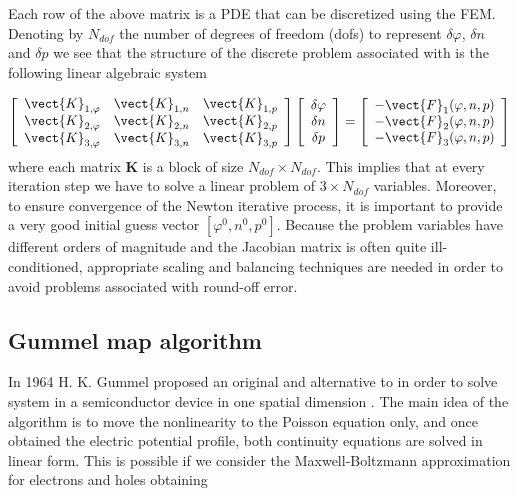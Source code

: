  Each row of the above matrix is a PDE that can be discretized using the FEM. Denoting by $N_{dof}$ the number of degrees of freedom (dofs) to represent $\delta \varphi$, $\delta n$ and $\delta p$ we see that the structure of the discrete problem associated with  is the following linear algebraic system

\begin{equation}
\left[
\begin{array}{ccc}
\vect{K}_{1,\varphi} & \vect{K}_{1,n} & \vect{K}_{1,p} \\
\vect{K}_{2,\varphi} & \vect{K}_{2,n} & \vect{K}_{2,p} \\
\vect{K}_{3,\varphi} & \vect{K}_{3,n} & \vect{K}_{3,p} \\
\end{array}
\right]
\left[
\begin{array}{c}
\delta \varphi  \\
\delta n  \\
\delta p 
\end{array}
\right]
=
\left[
\begin{array}{c}
-\vect{F}_1(\varphi,n,p) \\
-\vect{F}_2(\varphi,n,p)\\
-\vect{F}_3(\varphi,n,p)
\end{array}
\right]
\end{equation}
where each matrix $\mathbf{K}$ is a block of size $N_{dof} \times N_{dof}$. 
This implies that at every iteration step we have to solve a linear problem of $3 \times N_{dof}$ variables.
Moreover, to ensure convergence of the Newton iterative process, it is important to provide a very good initial guess vector $[\varphi^0,n^0,p^0]$. Because the problem variables have different orders of magnitude and the Jacobian matrix is often quite ill-conditioned, appropriate scaling and balancing techniques are needed in order to avoid problems associated with round-off error. 


\subsection{Gummel map algorithm}

In 1964 H. K. Gummel proposed an original and alternative to   in order to solve system  in a semiconductor device in one spatial dimension \cite{GummelMap}.
The main idea of the algorithm is to move the nonlinearity to the Poisson equation only, and once obtained the electric potential profile, both continuity equations are solved in linear form. This is possible if we consider the Maxwell-Boltzmann approximation for electrons  and holes  obtaining

